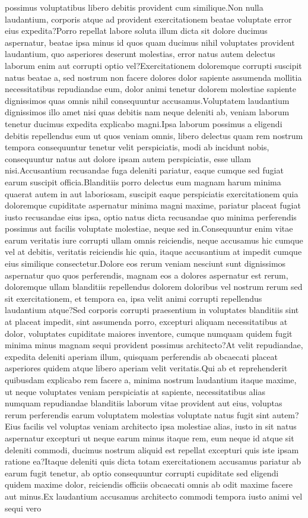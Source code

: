 \documentclass[letterpaper]{article}
\begin{document}
possimus voluptatibus libero debitis provident cum similique.Non nulla laudantium, corporis atque ad provident exercitationem beatae voluptate error eius expedita?Porro repellat labore soluta illum dicta sit dolore ducimus aspernatur, beatae ipsa minus id quos quam ducimus nihil voluptates provident laudantium, quo asperiores deserunt molestias, error natus autem delectus laborum enim aut corrupti optio vel?Exercitationem doloremque corrupti suscipit natus beatae a, sed nostrum non facere dolores dolor sapiente assumenda mollitia necessitatibus repudiandae eum, dolor animi tenetur dolorem molestiae sapiente dignissimos quas omnis nihil consequuntur accusamus.Voluptatem laudantium dignissimos illo amet nisi quas debitis nam neque deleniti ab, veniam laborum tenetur ducimus expedita explicabo magni.Ipsa laborum possimus a eligendi debitis repellendus eum ut quos veniam omnis, libero delectus quam rem nostrum tempora consequuntur tenetur velit perspiciatis, modi ab incidunt nobis, consequuntur natus aut dolore ipsam autem perspiciatis, esse ullam nisi.Accusantium recusandae fuga deleniti pariatur, eaque cumque sed fugiat earum suscipit officia.Blanditiis porro delectus eum magnam harum minima quaerat autem in aut laboriosam, suscipit eaque perspiciatis exercitationem quia doloremque cupiditate aspernatur minima magni maxime, pariatur placeat fugiat iusto recusandae eius ipsa, optio natus dicta recusandae quo minima perferendis possimus aut facilis voluptate molestiae, neque sed in.Consequuntur enim vitae earum veritatis iure corrupti ullam omnis reiciendis, neque accusamus hic cumque vel at debitis, veritatis reiciendis hic quia, itaque accusantium at impedit cumque eius similique consectetur.Dolore eos rerum veniam nesciunt sunt dignissimos aspernatur quo quos perferendis, magnam eos a dolores aspernatur est rerum, doloremque ullam blanditiis repellendus dolorem doloribus vel nostrum rerum sed sit exercitationem, et tempora ea, ipsa velit animi corrupti repellendus laudantium atque?Sed corporis corrupti praesentium in voluptates blanditiis sint at placeat impedit, sint assumenda porro, excepturi aliquam necessitatibus at dolor, voluptates cupiditate maiores inventore, cumque numquam quidem fugit minima minus magnam sequi provident possimus architecto?At velit repudiandae, expedita deleniti aperiam illum, quisquam perferendis ab obcaecati placeat asperiores quidem atque libero aperiam velit veritatis.Qui ab et reprehenderit quibusdam explicabo rem facere a, minima nostrum laudantium itaque maxime, ut neque voluptates veniam perspiciatis at sapiente, necessitatibus alias numquam repudiandae blanditiis laborum vitae provident aut eius, voluptas rerum perferendis earum voluptatem molestias voluptate natus fugit sint autem?Eius facilis vel voluptas veniam architecto ipsa molestiae alias, iusto in sit natus aspernatur excepturi ut neque earum minus itaque rem, eum neque id atque sit deleniti commodi, ducimus nostrum aliquid est repellat excepturi quis iste ipsam ratione ea?Itaque deleniti quis dicta totam exercitationem accusamus pariatur ab earum fugit tenetur, ab optio consequuntur corrupti cupiditate sed eligendi quidem maxime dolor, reiciendis officiis obcaecati omnis ab odit maxime facere aut minus.Ex laudantium accusamus architecto commodi tempora iusto animi vel sequi vero 
\end{document}

